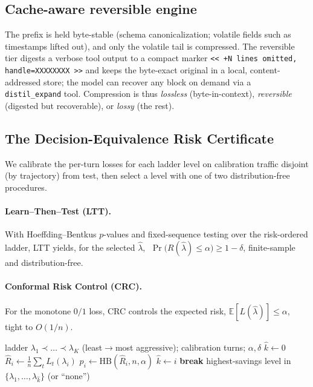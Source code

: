\documentclass{article}
\begin{document}
\subsection{Cache-aware reversible engine}
The prefix is held byte-stable (schema canonicalization; volatile fields such as
timestamps lifted out), and only the volatile tail is compressed. The reversible
tier digests a verbose tool output to a compact marker
\verb|<< +N lines omitted, handle=XXXXXXXX >>| and keeps the byte-exact original in a local,
content-addressed store; the model can recover any block on demand via a
\texttt{distil\_expand} tool. Compression is thus \emph{lossless} (byte-in-context),
\emph{reversible} (digested but recoverable), or \emph{lossy} (the rest).

\subsection{The Decision-Equivalence Risk Certificate}
We calibrate the per-turn losses for each ladder level on calibration traffic
disjoint (by trajectory) from test, then select a level with one of two
distribution-free procedures.

\paragraph{Learn--Then--Test (LTT).} With Hoeffding--Bentkus $p$-values and
fixed-sequence testing over the risk-ordered ladder, LTT yields, for the selected
$\hat\lambda$, $\;\Pr\!\big(R(\hat\lambda)\le\alpha\big)\ge 1-\delta$, finite-sample
and distribution-free.
\paragraph{Conformal Risk Control (CRC).} For the monotone $0/1$ loss, CRC controls
the expected risk, $\mathbb{E}[L(\hat\lambda)]\le\alpha$, tight to $O(1/n)$.

\begin{algorithm}[t]
\caption{LTT certification over the compression ladder}
\label{alg:ltt}
\begin{algorithmic}[1]
\Require ladder $\lambda_1\!\prec\!\dots\!\prec\!\lambda_K$ (least$\to$most aggressive); calibration turns; $\alpha,\delta$
\State $\hat k \gets 0$
  \State $\hat R_i \gets \frac{1}{n}\sum_t L_t(\lambda_i)$ 
  \State $p_i \gets \mathrm{HB}(\hat R_i, n, \alpha)$ 
   $\hat k \gets i$ 
  \Else{} \textbf{break} 
  \EndIf
\EndFor
\State \Return highest-savings level in $\{\lambda_1,\dots,\lambda_{\hat k}\}$ (or ``none'')
\end{algorithmic}
\end{algorithm}
\end{document}
